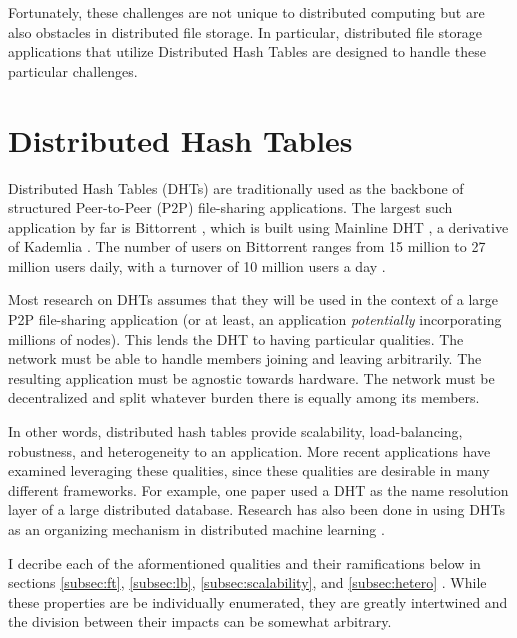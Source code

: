 \documentclass[10pt,letterpaper,twoside]{report}
\begin{document}
Fortunately, these challenges are not unique to distributed computing but are also obstacles in distributed file storage.  
In particular, distributed file storage applications that utilize Distributed Hash Tables are designed to handle these particular challenges.
\section{Distributed Hash Tables}
Distributed Hash Tables (DHTs) are traditionally used as the backbone of structured Peer-to-Peer (P2P) file-sharing applications.
The largest such application by far is Bittorrent \cite{bittorrent}, which is built using Mainline DHT \cite{mainline},  a  derivative of Kademlia \cite{kademlia}.
The number of users on Bittorrent ranges from 15 million to 27 million users daily, with a turnover of 10 million users a day \cite{mainline}.

Most research on DHTs assumes that they will be used in the context of a large P2P file-sharing application  (or at least, an application \textit{potentially} incorporating millions of nodes).
This lends the DHT to having particular qualities.
The network must be able to handle members joining and leaving arbitrarily.
The resulting application must be agnostic towards hardware.
The network must be decentralized and split whatever burden there is equally among its members.

In other words, distributed hash tables provide scalability, load-balancing, robustness, and heterogeneity to an application.
More recent applications have examined leveraging these qualities, since these qualities are desirable in many different frameworks.
For example, one paper \cite{Mateescu2011440} used a DHT as the name resolution layer of a large distributed database.
Research has also been done in using DHTs as an organizing mechanism in distributed machine learning \cite{liparameter}. 


I decribe each of the aformentioned qualities and their ramifications below in sections \ref{subsec:ft}, \ref{subsec:lb}, \ref{subsec:scalability}, and \ref{subsec:hetero} .
While these properties are  be individually enumerated, they are greatly intertwined and the division between their impacts can be somewhat arbitrary.
\end{document}
